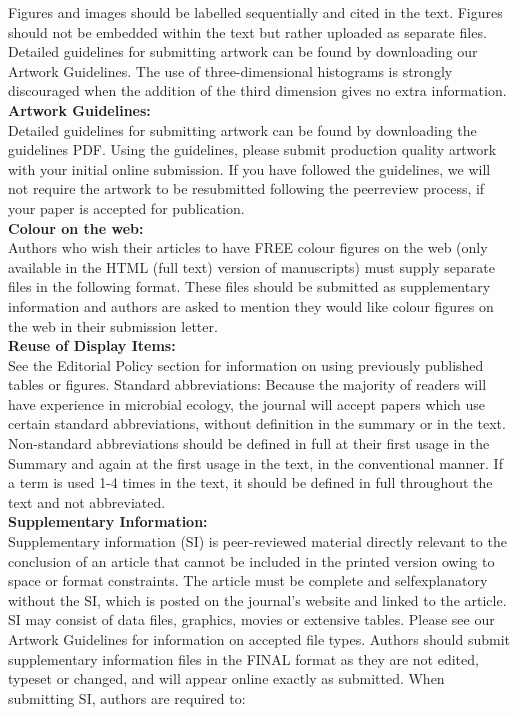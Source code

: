 \documentclass{article}
\begin{document}
Figures and images should be labelled sequentially and cited in the
text. Figures should not be embedded within the text but rather uploaded
as separate files. Detailed guidelines for submitting artwork can be
found by downloading our\\

Artwork Guidelines. The use of three-dimensional histograms is strongly
discouraged when the addition of the third dimension gives no extra
information.\\

\textbf{Artwork Guidelines:}\\

Detailed guidelines for submitting artwork can be found by downloading
the guidelines PDF. Using the guidelines, please submit production
quality artwork with your initial online submission. If you have
followed the guidelines, we will not require the artwork to be
resubmitted following the peerreview process, if your paper is accepted
for publication.\\

\textbf{Colour on the web:}\\

Authors who wish their articles to have FREE colour figures on the web
(only available in the HTML (full text) version of manuscripts) must
supply separate files in the following format. These files should be
submitted as supplementary information and authors are asked to mention
they would like colour figures on the web in their submission letter.\\

\textbf{Reuse of Display Items:}\\

See the Editorial Policy section for information on using previously
published tables or figures. Standard abbreviations: Because the
majority of readers will have experience in microbial ecology, the
journal will accept papers which use certain standard abbreviations,
without definition in the summary or in the text. Non-standard
abbreviations should be defined in full at their first usage in the
Summary and again at the first usage in the text, in the conventional
manner. If a term is used 1-4 times in the text, it should be defined in
full throughout the text and not abbreviated.\\

\textbf{Supplementary Information:}\\

Supplementary information (SI) is peer-reviewed material directly
relevant to the conclusion of an article that cannot be included in the
printed version owing to space or format constraints. The article must
be complete and selfexplanatory without the SI, which is posted on the
journal's website and linked to the article. SI may consist of data
files, graphics, movies or extensive tables. Please see our Artwork
Guidelines for information on accepted file types. Authors should submit
supplementary information files in the FINAL format as they are not
edited, typeset or changed, and will appear online exactly as submitted.
When submitting SI, authors are required to:\\
\end{document}
